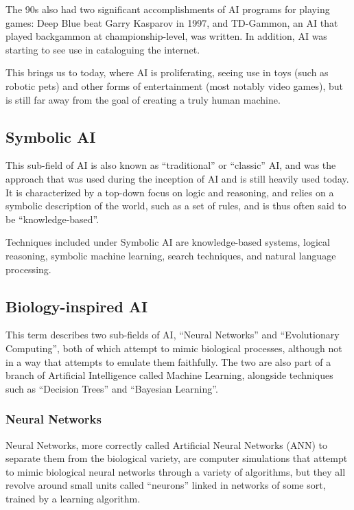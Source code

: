 The 90s also had two significant accomplishments of AI programs for playing
games: Deep Blue beat Garry Kasparov in 1997, and TD-Gammon, an AI that played
backgammon at championship-level, was written. In addition, AI was starting to
see use in cataloguing the internet.

This brings us to today, where AI is proliferating, seeing use in toys (such as
robotic pets) and other forms of entertainment (most notably video games), but
is still far away from the goal of creating a truly human machine.

\subsection{Symbolic AI}
\label{sec:symbolic-ai}

This sub-field of AI is also known as ``traditional'' or ``classic'' AI, and was
the approach that was used during the inception of AI and is still heavily used
today. It is characterized by a top-down focus on logic and reasoning, and
relies on a symbolic description of the world, such as a set of rules, and is
thus often said to be ``knowledge-based''.

Techniques included under Symbolic AI are knowledge-based systems, logical
reasoning, symbolic machine learning, search techniques, and natural language
processing.

\subsection{Biology-inspired AI}
\label{sec:biology-inspired-ai}

This term describes two sub-fields of AI, ``Neural Networks'' and ``Evolutionary
Computing'', both of which attempt to mimic biological processes, although not
in a way that attempts to emulate them faithfully. The two are also part of a
branch of Artificial Intelligence called Machine Learning, alongside techniques
such as ``Decision Trees'' and ``Bayesian Learning''.

\subsubsection{Neural Networks}
\label{sec:neural-networks}

Neural Networks, more correctly called Artificial Neural Networks (ANN) to
separate them from the biological variety, are computer simulations that attempt
to mimic biological neural networks through a variety of algorithms, but they
all revolve around small units called ``neurons'' linked in networks of some
sort, trained by a learning algorithm.

